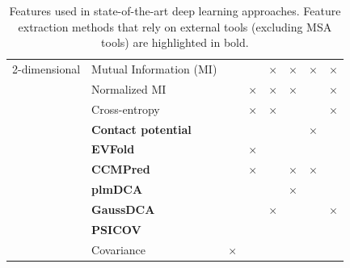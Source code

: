 \begin{landscape}
\begin{table}[H]
\begin{tabular}{llcccccc}
                    \hline
                    2-dimensional & Mutual Information (MI) & & & $\times$ & $\times$ & $\times$ & $\times$ \\
                    & Normalized MI & & $\times$ & $\times$ & $\times$ & & $\times$ \\
                    & Cross-entropy & & $\times$ & $\times$ & & & $\times$ \\
                    & \textbf{Contact potential} & & & & & $\times$ & \\
                    & \textbf{EVFold} & & $\times$ & & & & \\
                    & \textbf{CCMPred} & & $\times$ & & $\times$ & $\times$ & \\
                    & \textbf{plmDCA} & & & & $\times$ & & \\
                    & \textbf{GaussDCA} & & & $\times$ & & & $\times$ \\
                    & \textbf{PSICOV} & & & & & & \\
                    & Covariance & $\times$ & & & & & \\
                    \hline
                \end{tabular}
                    \caption{Features used in state-of-the-art deep learning approaches.
                        Feature extraction methods that rely on external tools (excluding
                        MSA tools) are highlighted in bold.}
                    \label{features}
            \end{table}
        \end{landscape}
